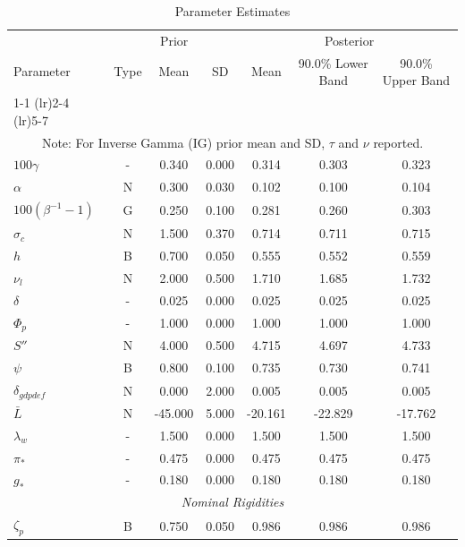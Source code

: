 \documentclass[12pt]{article}
\begin{document}
\pagestyle{empty}
\vspace*{.5cm}
{\small
\begin{longtable}{lcccccc}
\caption{Parameter Estimates}
\\ \hline
\multicolumn{1}{c}{} & \multicolumn{3}{c}{Prior} & \multicolumn{3}{c}{Posterior} \\
Parameter & Type & Mean & SD & Mean & 90.0\% {\tiny Lower Band} & 90.0\% {\tiny Upper Band} \\
\cmidrule(lr){1-1} \cmidrule(lr){2-4} \cmidrule(lr){5-7}
\endhead
\hline
\\ \multicolumn{7}{c}{\footnotesize Note: For Inverse Gamma (IG) prior mean and SD, $\tau$ and $\nu$ reported.}
\endfoot
\multicolumn{7}{c}{\textit{Steady State}} \\[3pt]
$100\gamma$ & - &    0.340 &    0.000 &    0.314 &    0.303 &    0.323 \\
$\alpha$ & N &    0.300 &    0.030 &    0.102 &    0.100 &    0.104 \\
$100(\beta^{-1} - 1)$ & G &    0.250 &    0.100 &    0.281 &    0.260 &    0.303 \\
$\sigma_{c}$ & N &    1.500 &    0.370 &    0.714 &    0.711 &    0.715 \\
$   h$ & B &    0.700 &    0.050 &    0.555 &    0.552 &    0.559 \\
$\nu_l$ & N &    2.000 &    0.500 &    1.710 &    1.685 &    1.732 \\
$\delta$ & - &    0.025 &    0.000 &    0.025 &    0.025 &    0.025 \\
$\Phi_p$ & - &    1.000 &    0.000 &    1.000 &    1.000 &    1.000 \\
$ S''$ & N &    4.000 &    0.500 &    4.715 &    4.697 &    4.733 \\
$\psi$ & B &    0.800 &    0.100 &    0.735 &    0.730 &    0.741 \\
$\delta_{gdpdef}$ & N &    0.000 &    2.000 &    0.005 &    0.005 &    0.005 \\
$\bar{L}$ & N &  -45.000 &    5.000 &  -20.161 &  -22.829 &  -17.762 \\
$\lambda_w$ & - &    1.500 &    0.000 &    1.500 &    1.500 &    1.500 \\
$\pi_*$ & - &    0.475 &    0.000 &    0.475 &    0.475 &    0.475 \\
$ g_*$ & - &    0.180 &    0.000 &    0.180 &    0.180 &    0.180 \\
\multicolumn{7}{c}{\textit{Nominal Rigidities}} \\[3pt]
$\zeta_p$ & B &    0.750 &    0.050 &    0.986 &    0.986 &    0.986 \\

\end{longtable}}
\end{document}
